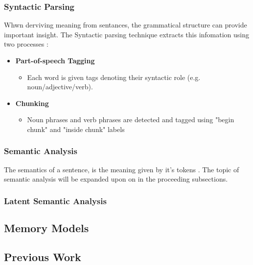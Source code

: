 \documentclass[twocolumn]{article}
\begin{document}
\subsubsection{Syntactic Parsing}
\label{sec:SyntacticParsing}
Whwn derviving meaning from sentances, the grammatical structure can provide important insight. The Syntactic parsing technique extracts this infomation using two processes \cite{NLPAlmostFromScratch}: 
\begin{itemize}
	\item \textbf{Part-of-speech Tagging}
	
	\begin{itemize}
		\item Each word is given tags denoting their syntactic role (e.g. noun/adjective/verb).
	\end{itemize}		
	
	\item \textbf{Chunking}
	
	\begin{itemize}
		\item Noun phrases and verb phrases are detected and tagged using "begin chunk" and "inside chunk" labels
	\end{itemize}	
	
\end{itemize}

\subsubsection{Semantic Analysis}
\label{sec:SemanticAnalysis}
The semantics of a sentence, is the meaning given by it's tokens \cite{SemanticAnalysisAPracticalIntro}. The topic of semantic analysis will be expanded upon on in the proceeding subsections.

\subsubsection{Latent Semantic Analysis}
\label{sec:LSA}



\subsection{Memory Models}
\label{sec:MemModels}

\subsection{Previous Work}
\label{sec:PrevWork}


\newpage


\end{document}
